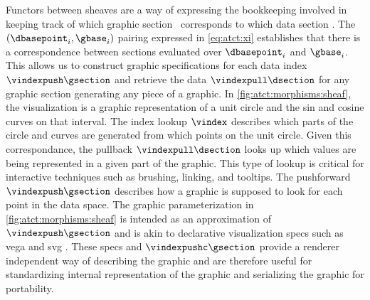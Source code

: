 \documentclass[10pt,journal,compsoc]{IEEEtran}
\theoremstyle{definition}
\theoremstyle{remark}
\begin{document}
Functors between sheaves are a way of expressing the bookkeeping involved in keeping track of which graphic section \gsection\ corresponds to which data section \dsection. The $(\dbasepoint_i, \gbase_i)$ pairing expressed in \autoref{eq:atct:xi} establishes that there is a correspondence between sections evaluated over $\dbasepoint_i$ and $\gbase_i$. This allows us to construct graphic specifications for each data index $\vindexpush\gsection$ and retrieve the data $\vindexpull\dsection$ for any graphic section generating any piece of a graphic. In \autoref{fig:atct:morphisms:sheaf}, the visualization is a graphic representation of a unit circle and the sin and cosine curves on that interval. The index lookup $\vindex$ describes which parts of the circle and curves are generated from which points on the unit circle. Given this correspondance, the pullback $\vindexpull\dsection$ looks up which values are being represented in a given part of the graphic. This type of lookup is critical for interactive techniques such as brushing, linking, and tooltips\cite{beckerBrushingScatterplots1987}. The pushforward $\vindexpush\gsection$ describes how a graphic is supposed to look for each point in the data space. The graphic parameterization in \autoref{fig:atct:morphisms:sheaf} is intended as an approximation of $\vindexpush\gsection$ and is akin to declarative visualization specs such as vega \cite{satyanarayanDeclarativeInteractionDesign2014} and svg \cite{quintScalable2003}. These specs and $\vindexpushc\gsection$ provide a renderer independent way of describing the graphic and are therefore useful for standardizing internal representation of the graphic and serializing the graphic for portability.  
\end{document}
